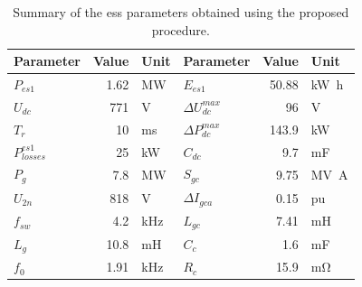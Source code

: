 \documentclass[utf8]{frontiersSCNS} %
\begin{document}




\begin{table}[htp!]
\caption{Summary of the \gls{ess} parameters obtained using the proposed procedure.}
\centering
\begin{tabular}{lrl|lrl}
    \toprule
    \textbf{Parameter}	& \textbf{Value} & \textbf{Unit} & \textbf{Parameter}	& \textbf{Value} & \textbf{Unit} \\
    \midrule
	$ P_{es1} $ & 1.62 & \si{\mega\watt} & $ E_{es1} $ & 50.88 & \si{\kilo\watt\hour} \\
	$ U_{dc} $ & 771 & \si{\volt} & $ \Delta U_{dc}^{max}$ & 96 & \si{\volt} \\
	$ T_r $ & 10 & \si{\milli\second} & $ \Delta P_{dc}^{max} $ & 143.9 & \si{\kilo\watt} \\
	$ P_{losses}^{es1} $ & 25 & \si{\kilo\watt} & $ C_{dc} $ & 9.7 & \si{\milli\farad} \\
	$ P_{g} $ & 7.8 & \si{\mega\watt} & $ S_{gc} $ & 9.75 & \si{\mega\volt\ampere} \\ 
	$ U_{2n} $ & 818 & \si{\volt} & $ \Delta I_{gca}$ & 0.15 & pu \\
	$ f_{sw} $ & 4.2 & \si{\kilo\hertz} & $L_{gc}$ & 7.41 & \si{\milli\henry} \\	
    $ L_{g} $ & 10.8 & \si{\milli\henry} & $C_{c}$ & 1.6 & \si{\milli\farad} \\
    $ f_{0} $ & 1.91 & \si{\kilo\hertz} & $R_{c}$ & 15.9 & \si{\milli\ohm} \\
\end{tabular}
\label{tab:results-case-study}
\end{table}
\end{document}
